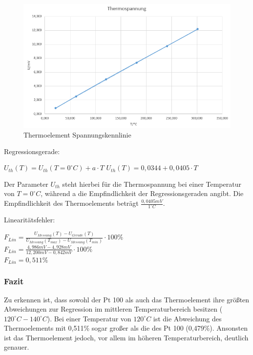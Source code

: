 \documentclass[a4paper,11pt,oneside]{article}
\begin{document}
\begin{figure}[h]
\centering
\includegraphics[scale=0.8]{Bilder/Aufg2Diagramm.png}
\caption{Thermoelement Spannungskennlinie}
\end{figure}

Regressionsgerade:
\begin{center}
$U_{th}(T) = U_{th}(T=0^\circ C) + a \cdot T$
$U_{th}(T) = 0,0344 + 0,0405 \cdot T$
\end{center}

Der Parameter $U_{th}$ steht hierbei für die Thermospannung bei einer Temperatur von $T = 0^\circ C$, während a die Empfindlichkeit der Regressionsgeraden angibt. Die Empfindlichkeit des Thermoelements beträgt $\frac{0,0405 mV}{1 ^\circ C}$.

\newpage

Linearitätsfehler:

\begin{center}
$F_{Lin} = \frac{U_{Messung}(T) - U_{Gerade}(T)}{U_{Messung}(T_{max}) - U_{Messung}(T_{min})}\cdot 100\%$\\
\vspace{0.5cm}
$F_{Lin} = \frac{4,986mV - 4,928mV}{12,200mV-0,842mV}\cdot 100\%$\\
\vspace{0.5cm}
$F_{Lin} = 0,511\%$
\end{center}

\subsubsection{Fazit}
Zu erkennen ist, dass sowohl der Pt 100 als auch das Thermoelement ihre größten Abweichungen zur Regression im mittleren Temperaturbereich besitzen ($120^\circ C - 140^\circ C$). Bei einer Temperatur von $120^\circ C$ ist die Abweichung des Thermoelements mit 0,511\% sogar großer als die des Pt 100 (0,479\%). Ansonsten ist das Thermoelement jedoch, vor allem im höheren Temperaturbereich, deutlich genauer.
\end{document}
